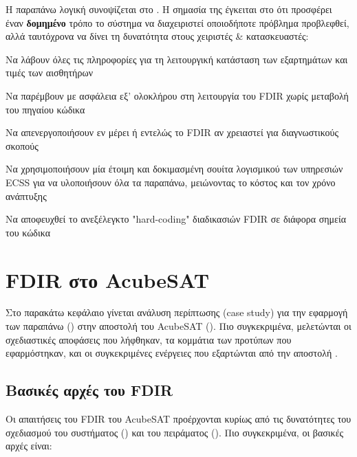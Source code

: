 \documentclass[a4paper,nobib]{tufte-book}
\begin{document}
Η παραπάνω λογική συνοψίζεται στο . Η σημασία της έγκειται στο ότι προσφέρει έναν \textbf{δομημένο} τρόπο το σύστημα να διαχειριστεί οποιοδήποτε πρόβλημα προβλεφθεί, αλλά ταυτόχρονα να δίνει τη δυνατότητα στους χειριστές \& κατασκευαστές:
\begin{compactitem}
	\item Να λάβουν όλες τις πληροφορίες για τη λειτουργική κατάσταση των εξαρτημάτων και τιμές των αισθητήρων
	\item Να παρέμβουν με ασφάλεια εξ' ολοκλήρου στη λειτουργία του \acs{FDIR} χωρίς μεταβολή του πηγαίου κώδικα
	\item Να απενεργοποιήσουν εν μέρει ή εντελώς το \acs{FDIR} αν χρειαστεί για διαγνωστικούς σκοπούς
	\item Να χρησιμοποιήσουν μία έτοιμη και δοκιμασμένη σουίτα λογισμικού των υπηρεσιών \acs{ECSS} για να υλοποιήσουν όλα τα παραπάνω, μειώνοντας το κόστος και τον χρόνο ανάπτυξης
	\item Να αποφευχθεί το ανεξέλεγκτο "hard-coding" διαδικασιών \acs{FDIR} σε διάφορα σημεία του κώδικα
\end{compactitem}


\chapter{\acs{FDIR} στο AcubeSAT}
\label{cap:acufdir}

Στο παρακάτω κεφάλαιο γίνεται ανάλυση περίπτωσης (case study) για την εφαρμογή των παραπάνω () στην αποστολή του AcubeSAT (). Πιο συγκεκριμένα, μελετώνται οι σχεδιαστικές αποφάσεις που λήφθηκαν, τα κομμάτια των προτύπων που εφαρμόστηκαν, και οι συγκεκριμένες ενέργειες που εξαρτώνται από την αποστολή \parencite{FMEA}.

\section{Βασικές αρχές του \acs{FDIR}}
\label{sec:fdirbaspri}

Οι απαιτήσεις του \acs{FDIR} του AcubeSAT προέρχονται κυρίως από τις δυνατότητες του σχεδιασμού του συστήματος () και του πειράματος (). Πιο συγκεκριμένα, οι βασικές αρχές είναι:
\end{document}
